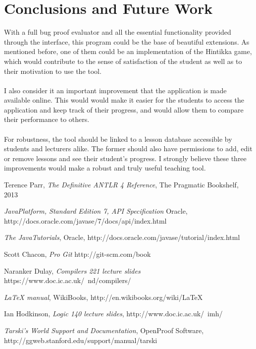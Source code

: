 \documentclass{report}
\begin{document}
\section{Conclusions and Future Work}
With a full bug proof evaluator and all the essential functionality provided 
through the interface, this program could be the base of beautiful extensions. 
As mentioned before, one of them could be an implementation of the Hintikka 
game, which would contribute to the sense of satisfaction of the student as 
well as to their motivation to use the tool. 
\\ \\
I also consider it an important improvement that the application is made 
available online. This would would make it easier for the students to access the 
application and keep track of their progress, and would allow them to compare 
their performance to others.
\\ \\ 
For robustness, the tool should be linked to a lesson database accessible by
students and lecturers alike. The former should also have permissions to add,
edit or remove lessons and see their student's progress. I strongly believe
these three improvements would make a robust and truly useful teaching tool.

\begin{thebibliography}{9}
  Terence Parr,
  \emph{The Definitive ANTLR 4 Reference},
  The Pragmatic Bookshelf, 2013

  \emph{Java\textregistered Platform, Standard Edition 7, API Specification}
  Oracle,
  http://docs.oracle.com/javase/7/docs/api/index.html 

  \emph{The Java\textregistered Tutorials},
  Oracle,
  http://docs.oracle.com/javase/tutorial/index.html

  Scott Chacon,
  \emph{Pro Git}
  http://git-scm.com/book

  Naranker Dulay,
  \emph{Compilers 221 lecture slides}
  https://www.doc.ic.ac.uk/~nd/compilers/

  \emph{LaTeX manual},
  WikiBooks,
  http://en.wikibooks.org/wiki/LaTeX

  Ian Hodkinson,
  \emph{Logic 140 lecture slides},
  http://www.doc.ic.ac.uk/~imh/

  \emph{Tarski's World Support and Documentation},
  OpenProof Software,
  http://ggweb.stanford.edu/support/manual/tarski

\end{thebibliography}
\end{document}

